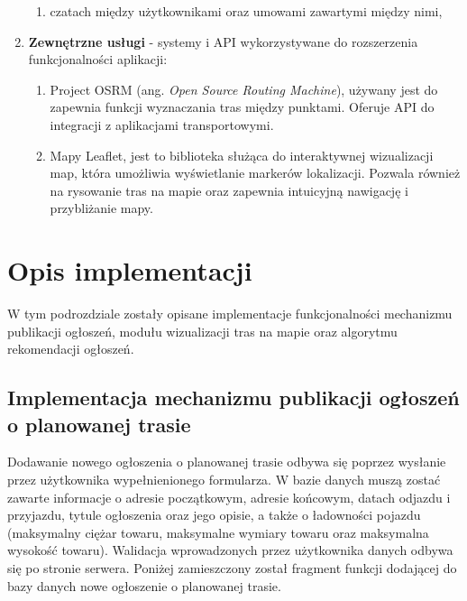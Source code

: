\begin{enumerate}
\begin{enumerate}
        \item czatach między użytkownikami oraz umowami zawartymi między nimi,
    \end{enumerate}
    \item \textbf{Zewnętrzne usługi} - systemy i API wykorzystywane do rozszerzenia funkcjonalności aplikacji:
    \begin{enumerate}
        \item Project OSRM (ang. \emph{Open Source Routing Machine}), używany jest do zapewnia funkcji wyznaczania tras między punktami. Oferuje API do integracji z aplikacjami transportowymi.
        \item Mapy Leaflet, jest to biblioteka służąca do interaktywnej wizualizacji map, która umożliwia wyświetlanie markerów lokalizacji. Pozwala również na rysowanie tras na mapie oraz zapewnia intuicyjną nawigację i przybliżanie mapy.
    \end{enumerate}
\end{enumerate}

\section{Opis implementacji}
W tym podrozdziale zostały opisane implementacje funkcjonalności mechanizmu publikacji ogłoszeń, modułu wizualizacji tras na mapie oraz algorytmu rekomendacji ogłoszeń.

\subsection{Implementacja mechanizmu publikacji ogłoszeń o planowanej trasie}
Dodawanie nowego ogłoszenia o planowanej trasie odbywa się poprzez wysłanie przez użytkownika wypełnienionego formularza. W bazie danych muszą zostać zawarte informacje o adresie początkowym, adresie końcowym, datach odjazdu i przyjazdu, tytule ogłoszenia oraz jego opisie, a także o ładowności pojazdu (maksymalny ciężar towaru, maksymalne wymiary towaru oraz maksymalna wysokość towaru). Walidacja wprowadzonych przez użytkownika danych odbywa się po stronie serwera. Poniżej zamieszczony został fragment funkcji dodającej do bazy danych nowe ogłoszenie o planowanej trasie.

